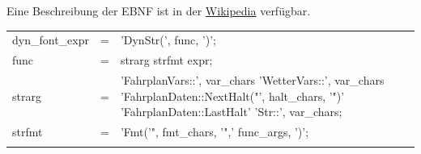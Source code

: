 Eine Beschreibung der EBNF ist in der \href{http://de.wikipedia.org/wiki/EBNF}{Wikipedia} verfügbar.

\begin{longtable}[c]{@{}lll@{}}
\hline\noalign{\medskip}
\begin{minipage}[t]{0.22\columnwidth}\raggedright
dyn\_font\_expr
\end{minipage} & \begin{minipage}[t]{0.06\columnwidth}\raggedright
=
\end{minipage} & \begin{minipage}[t]{0.73\columnwidth}\raggedright
'DynStr(', func, ')';
\end{minipage}
\\\noalign{\medskip}
\begin{minipage}[t]{0.17\columnwidth}\raggedright
func
\end{minipage} & \begin{minipage}[t]{0.06\columnwidth}\raggedright
=
\end{minipage} & \begin{minipage}[t]{0.78\columnwidth}\raggedright
strarg \textbar{} strfmt \textbar{} expr;
\end{minipage}
\\\noalign{\medskip}
\begin{minipage}[t]{0.17\columnwidth}\raggedright
strarg
\end{minipage} & \begin{minipage}[t]{0.06\columnwidth}\raggedright
=
\end{minipage} & \begin{minipage}[t]{0.78\columnwidth}\raggedright
'FahrplanVars::', var\_chars \textbar{} 'WetterVars::', var\_chars
\textbar{} 'FahrplanDaten::NextHalt("', halt\_chars, '")' \textbar{} 'FahrplanDaten::LastHalt' \textbar{} 'Str::', var\_chars;
\end{minipage}
\\\noalign{\medskip}
\begin{minipage}[t]{0.17\columnwidth}\raggedright
strfmt
\end{minipage} & \begin{minipage}[t]{0.06\columnwidth}\raggedright
=
\end{minipage} & \begin{minipage}[t]{0.78\columnwidth}\raggedright
'Fmt('", fmt\_chars, '",' func\_args, ')';
\end{minipage}
\\\noalign{\medskip}
\begin{minipage}[t]{0.17\columnwidth}\raggedright

\end{minipage}
\end{longtable}
